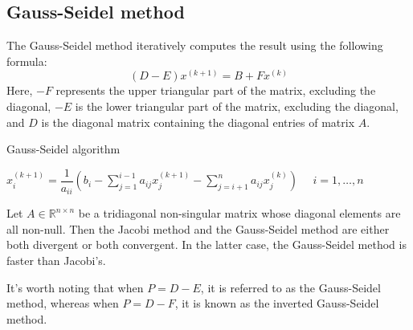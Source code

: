 \documentclass[12pt, a4paper]{report}
\begin{document}
    \subsection{Gauss-Seidel method}
    The Gauss-Seidel method iteratively computes the result using the following formula:
    \[\left(D-E\right)x^{(k+1)}=B+Fx^{(k)}\]
    Here, $-F$ represents the upper triangular part of the matrix, excluding the diagonal, $-E$ is the lower triangular part of the matrix, excluding the diagonal, and $D$ is the diagonal matrix containing the diagonal entries of matrix $A$.
    \begin{algorithm}[H]
        \caption{Gauss-Seidel algorithm}
            \begin{algorithmic}[1]
                \State $x_i^{(k+1)}=\dfrac{1}{a_{ii}}\left( b_i-\sum_{j=1}^{i-1}a_{ij}x_j^{(k+1)}-\sum_{j=i+1}^{n}a_{ij}x_j^{(k)}\right) \:\:\:\:\:\: i=1,\dots,n $
            \end{algorithmic}
    \end{algorithm}
    \begin{proposition}
        Let $A \in \mathbb{R}^{n \times n}$ be a tridiagonal non-singular matrix whose diagonal elements are all non-null. 
        Then the Jacobi method and the Gauss-Seidel method are either both divergent or both convergent. 
        In the latter case, the Gauss-Seidel method is faster than Jacobi's. 
    \end{proposition}
    It's worth noting that when $P=D-E$, it is referred to as the Gauss-Seidel method, whereas when $P=D-F$, it is known as the inverted Gauss-Seidel method.
\end{document}
